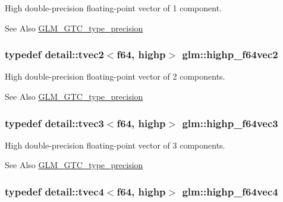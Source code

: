 High double-\/precision floating-\/point vector of 1 component. \begin{DoxySeeAlso}{See Also}
\hyperlink{group__gtc__type__precision}{G\-L\-M\-\_\-\-G\-T\-C\-\_\-type\-\_\-precision} 
\end{DoxySeeAlso}
\hypertarget{group__gtc__type__precision_ga1efd4982eaeafae59ce40deb89e018e7}{
\subsubsection[{highp\-\_\-f64vec2}]{\setlength{\rightskip}{0pt plus 5cm}typedef detail\-::tvec2$<$f64, highp$>$ {\bf glm\-::highp\-\_\-f64vec2}}}\label{group__gtc__type__precision_ga1efd4982eaeafae59ce40deb89e018e7}
High double-\/precision floating-\/point vector of 2 components. \begin{DoxySeeAlso}{See Also}
\hyperlink{group__gtc__type__precision}{G\-L\-M\-\_\-\-G\-T\-C\-\_\-type\-\_\-precision} 
\end{DoxySeeAlso}
\hypertarget{group__gtc__type__precision_ga93cbac95bb9106fe15c987c0f56ae679}{
\subsubsection[{highp\-\_\-f64vec3}]{\setlength{\rightskip}{0pt plus 5cm}typedef detail\-::tvec3$<$f64, highp$>$ {\bf glm\-::highp\-\_\-f64vec3}}}\label{group__gtc__type__precision_ga93cbac95bb9106fe15c987c0f56ae679}
High double-\/precision floating-\/point vector of 3 components. \begin{DoxySeeAlso}{See Also}
\hyperlink{group__gtc__type__precision}{G\-L\-M\-\_\-\-G\-T\-C\-\_\-type\-\_\-precision} 
\end{DoxySeeAlso}
\hypertarget{group__gtc__type__precision_ga1e9d8145fb9521701a5eeb6df5754184}{
\subsubsection[{highp\-\_\-f64vec4}]{\setlength{\rightskip}{0pt plus 5cm}typedef detail\-::tvec4$<$f64, highp$>$ {\bf glm\-::highp\-\_\-f64vec4}}}\label{group__gtc__type__precision_ga1e9d8145fb9521701a5eeb6df5754184}
